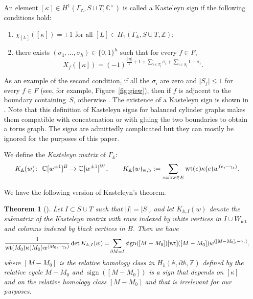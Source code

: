 \documentclass[pdftex]{sigma}
\numberwithin{equation}{section}
\newtheorem{Theorem}{Theorem}[section]
\newcommand{\Z}{{\mathbb Z}}
\newcommand{\C}{{\mathbb C}}
\newcommand{\A}{{\mathbb A}}
\newcommand{\ra}{\rightarrow}
\newcommand{\la}{\label}
\newcommand{\w}{{\rm w}}
\newcommand{\bw}{{\rm b}}
\newcommand{\wt}{{\rm wt}}
\begin{document}
	An element $[\kappa] \in H^1(\Gamma_\A,S \cup T,\C^\times)$ is called a Kasteleyn sign if the following conditions hold:
	\begin{enumerate}\itemsep=0pt
		\item[(1)] $\chi_{[L]}([\kappa])=\pm 1$ for all $[L] \in H_1(\Gamma_\A,S \cup T,\Z)$;
		\item[(2)] there exists $(\sigma_1,\dots,\sigma_h)\in\{0,1\}^h$ such that for every $f\in F$,
		\[
			X_f([\kappa])=(-1)^{\frac{|\partial f|}{2}+1+\sum\limits_{i\in T_f} \sigma_i + \sum\limits_{i\in S_f} 1-\sigma_i}.
		\]
	\end{enumerate}
	As an example of the second condition, if all the $\sigma_i$ are zero and $|S_f|\leq1$ for every $f\in F$ (see, for example, Figure~\ref{fig:giew}), then  if $f$ is adjacent to the boundary containing~$S$, otherwise .
	The existence of a Kasteleyn sign is shown in \cite[Proposition~2.1]{CR2}. Note that this definition of Kasteleyn signs for balanced cylinder graphs makes them compatible with concatenation or with gluing the two boundaries to obtain a torus graph. {The signs are admittedly complicated but they can mostly be ignored for the purposes of this paper.}
	
	We define the \emph{Kasteleyn matrix} of $\Gamma_\A$:
	\begin{align*}
		K_\A(w)\colon \ \C[w^{\pm 1}]^B \ra \C[w^{\pm 1}]^W, \qquad
		K_\A(w)_{{\rm w},{\rm b}} :=\sum_{e=\bw \w\in E} {\rm wt}(e) \kappa(e) w^{(e,-\gamma_z)}.
	\end{align*}
	
	We have the following version of Kasteleyn's theorem.
	\begin{Theorem}[]\la{thm:cimres}
		Let $I \subset S \cup T$ such that $|I|=|S|$, and let $K_{\A,I}(w)$ denote the submatrix of the Kasteleyn matrix with rows indexed by white vertices in $I \cup W_{\text{int}}$ and columns indexed by black vertices in $B$. Then we have
		\begin{gather*}
		\frac{1}{\wt(M_0) \kappa(M_0)w^{(M_0,-\gamma_z)}}\det K_{\A,I}(w)=\!\sum_{\partial M=I} \operatorname{sign}([M-M_0]) [\wt]([M-M_0]) w^{([M-M_0],-\gamma_z)},
		\end{gather*}
		where $[M-M_0]$ is the relative homology class in $H_1(\A, \partial \A,\Z)$ defined by the relative cycle $M-M_0$ and $\operatorname{sign}([M-M_0])$ is a sign that depends on $[\kappa]$ and on the relative homology class $[M-M_0]$ and that is irrelevant for our purposes.
	\end{Theorem}
	
\end{document}
